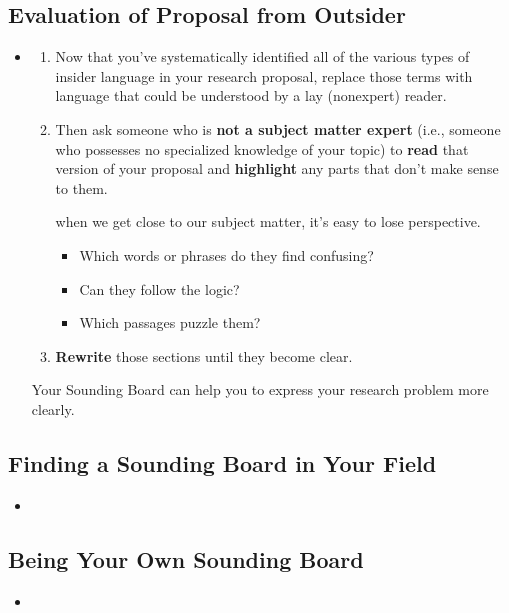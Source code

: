 \documentclass[11pt]{article}
\begin{document}
\subsection{Evaluation of Proposal from Outsider}
\begin{itemize}
\item \begin{exercise}
\begin{enumerate}
\item Now that you’ve systematically identified all of the various types of insider language in your research proposal,
replace those terms with language that could be understood by a lay (nonexpert) reader. 

\item Then ask someone who is \textbf{not a subject matter expert} (i.e., someone who possesses no specialized knowledge of your topic) to \textbf{read} that version of your proposal and \textbf{highlight} any parts that don’t make sense to them.

when we get close to our subject matter, it’s easy to lose perspective. 
\begin{itemize}
\item Which words or phrases do they find confusing? 
\item Can they follow the logic?
\item Which passages puzzle them? 
\end{itemize}
 
\item \textbf{Rewrite} those sections until they become clear. 
\end{enumerate}
Your Sounding Board can help you to express your research problem more clearly.
\end{exercise}
\end{itemize}
\subsection{Finding a Sounding Board in Your Field}
\begin{itemize}
\item \begin{exercise}
\end{exercise}
\end{itemize}
\subsection{Being Your Own Sounding Board}
\begin{itemize}
\item \begin{exercise}
\end{exercise}
\end{itemize}
\newpage
\end{document}
